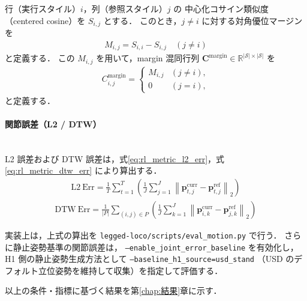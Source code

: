 行（実行スタイル）$i$，列（参照スタイル）$j$ の
中心化コサイン類似度（centered cosine）を $S_{i,j}$ とする．
このとき，$j\neq i$ に対する対角優位マージンを
\begin{align}
  M_{i,j}=S_{i,i}-S_{i,j}\quad (j\neq i)
\end{align}
と定義する．
この $M_{i,j}$ を用いて，margin 混同行列
$\mathbf{C}^{\mathrm{margin}}\in\mathbb{R}^{|\mathcal{S}|\times|\mathcal{S}|}$ を
\begin{align}
  C^{\mathrm{margin}}_{i,j}=
  \begin{cases}
    M_{i,j} & (j\neq i), \\
    0 & (j=i),
  \end{cases}
  \label{eq:rl_metric_margin_matrix}
\end{align}
と定義する．



\paragraph{関節誤差（L2 / DTW）}\quad\\

L2 誤差および DTW 誤差は，式\ref{eq:rl_metric_l2_err}，式\ref{eq:rl_metric_dtw_err} により算出する．
\begin{align}
  \mathrm{L2\ Err}
  =
  \frac{1}{T}\sum_{t=1}^{T}
  \left(
  \frac{1}{J}\sum_{j=1}^{J}
  \left\lVert \mathbf{p}^{\mathrm{curr}}_{t,j} - \mathbf{p}^{\mathrm{ref}}_{t,j} \right\rVert_{2}
  \right)
  \label{eq:rl_metric_l2_err}
\end{align}
\begin{align}
  \mathrm{DTW\ Err}
  =
  \frac{1}{|P|}\sum_{(i,j)\in P}
  \left(
  \frac{1}{J}\sum_{k=1}^{J}
  \left\lVert \mathbf{p}^{\mathrm{curr}}_{i,k} - \mathbf{p}^{\mathrm{ref}}_{j,k} \right\rVert_{2}
  \right)
  \label{eq:rl_metric_dtw_err}
\end{align}

実装上は，上式の算出を
\texttt{legged-loco/scripts/eval\_motion.py} で行う．
さらに静止姿勢基準の関節誤差は，
\texttt{--enable\_joint\_error\_baseline} を有効化し，
H1 側の静止姿勢生成方法として
\texttt{--baseline\_h1\_source=usd\_stand}
（USD のデフォルト立位姿勢を維持して収集）を指定して評価する．

以上の条件・指標に基づく結果を第\ref{chap:結果}章に示す．
